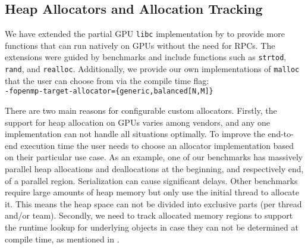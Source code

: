 \subsection{Heap Allocators and Allocation Tracking}
\label{sec:allocators}

We have extended the partial GPU \lstinline{libc} implementation by \citet{DBLP:conf/llvmhpc/TianHPCD22} to provide more functions that can run natively on GPUs without the need for RPCs.
The extensions were guided by benchmarks and include functions such as \lstinline{strtod}, \lstinline{rand}, and \lstinline|realloc|.
Additionally, we provide our own implementations of \lstinline{malloc} that the user can choose from via the compile time flag:\\
\texttt{-fopenmp-target-allocator=\{generic,balanced[N,M]\}}

There are two main reasons for configurable custom allocators.
Firstly, the support for heap allocation on GPUs varies among vendors, and any one implementation can not handle all situations optimally.
To improve the end-to-end execution time the user needs to choose an allocator implementation based on their particular use case.
As an example, one of our benchmarks has massively parallel heap allocations and deallocations at the beginning, and respectively end, of a parallel region.
Serialization can cause significant delays.
Other benchmarks require large amounts of heap memory but only use the initial thread to allocate it.
This means the heap space can not be divided into exclusive parts (per thread and/or team).
Secondly, we need to track allocated memory regions to support the runtime lookup for underlying objects in case they can not be determined at compile time, as mentioned in .

